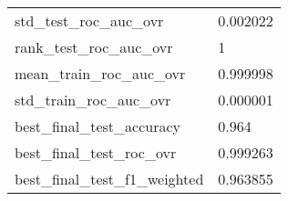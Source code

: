 \begin{tabular}{ll}
std\_test\_roc\_auc\_ovr        &                                           0.002022 \\
rank\_test\_roc\_auc\_ovr       &                                                  1 \\
mean\_train\_roc\_auc\_ovr      &                                           0.999998 \\
std\_train\_roc\_auc\_ovr       &                                           0.000001 \\
best\_final\_test\_accuracy    &                                              0.964 \\
best\_final\_test\_roc\_ovr     &                                           0.999263 \\
best\_final\_test\_f1\_weighted &                                           0.963855 \\
\bottomrule
\end{tabular}

